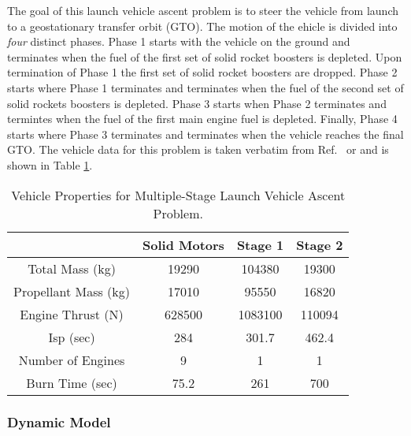 \documentclass[10pt]{article}
\begin{document}
The goal of this launch vehicle ascent problem is to steer the
vehicle from launch to a geostationary transfer orbit (GTO).  The
motion of the ehicle is divided into {\em four} distinct phases.
Phase 1 starts with the vehicle on the ground and terminates
when the fuel of the first set of solid rocket boosters is depleted.  Upon
termination of Phase 1 the first set of solid rocket boosters are
dropped. Phase 2 starts where Phase 1 terminates and terminates when
the fuel of the second set of solid rockets boosters is depleted.
Phase 3 starts when Phase 2 terminates and termintes when the fuel of
the first main engine fuel is depleted.  Finally, Phase 4 starts where
Phase 3 terminates and terminates when the vehicle reaches the final
GTO.  The vehicle data for this problem is taken verbatim from
Ref.~ or  and is shown in Table
\ref{table: launch vehicle properties}. 

\begin{table}[htdp]
\centering
\caption{Vehicle Properties for Multiple-Stage Launch Vehicle Ascent Problem. \label{table: launch vehicle properties}}
\begin{tabular}{|c|c|c|c|}
\hline
 & Solid Motors & Stage 1 & Stage 2 \\
 \hline \hline
 Total Mass (kg) & 19290 & 104380 & 19300 \\
 \hline
 Propellant Mass (kg) & 17010 & 95550 & 16820 \\
 \hline
 Engine Thrust (N) & 628500 & 1083100 & 110094 \\
 \hline
 Isp (sec) & 284 & 301.7 & 462.4 \\
 \hline
 Number of Engines & 9 & 1 & 1 \\
 \hline
 Burn Time (sec) & 75.2 & 261 & 700 \\
 \hline
\end{tabular}
\end{table}

\subsubsection{Dynamic Model}
\end{document}
